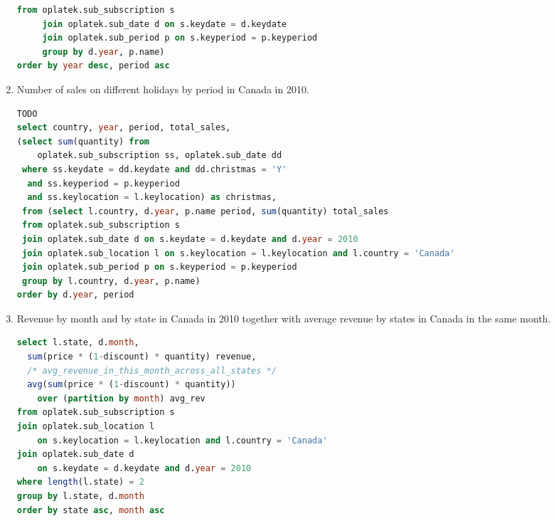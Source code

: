\begin{enumerate}
\begin{lstlisting}[language=sql]
     from oplatek.sub_subscription s 
     join oplatek.sub_date d on s.keydate = d.keydate
     join oplatek.sub_period p on s.keyperiod = p.keyperiod
     group by d.year, p.name)
order by year desc, period asc
\end{lstlisting}
  \item Number of sales on different holidays by period in Canada in 2010.
\begin{lstlisting}[language=sql] 
TODO
select country, year, period, total_sales, 
(select sum(quantity) from 
    oplatek.sub_subscription ss, oplatek.sub_date dd 
 where ss.keydate = dd.keydate and dd.christmas = 'Y' 
  and ss.keyperiod = p.keyperiod 
  and ss.keylocation = l.keylocation) as christmas,
 from (select l.country, d.year, p.name period, sum(quantity) total_sales
 from oplatek.sub_subscription s 
 join oplatek.sub_date d on s.keydate = d.keydate and d.year = 2010
 join oplatek.sub_location l on s.keylocation = l.keylocation and l.country = 'Canada'
 join oplatek.sub_period p on s.keyperiod = p.keyperiod 
 group by l.country, d.year, p.name)
order by d.year, period
\end{lstlisting}
  \item Revenue by month and by state in Canada in 2010 together with average revenue by states in Canada in the same month.
\begin{lstlisting}[language=sql] 
select l.state, d.month, 
  sum(price * (1-discount) * quantity) revenue,
  /* avg_revenue_in_this_month_across_all_states */
  avg(sum(price * (1-discount) * quantity)) 
    over (partition by month) avg_rev 
from oplatek.sub_subscription s 
join oplatek.sub_location l 
    on s.keylocation = l.keylocation and l.country = 'Canada' 
join oplatek.sub_date d 
    on s.keydate = d.keydate and d.year = 2010
where length(l.state) = 2
group by l.state, d.month
order by state asc, month asc
\end{lstlisting}
\end{enumerate}

